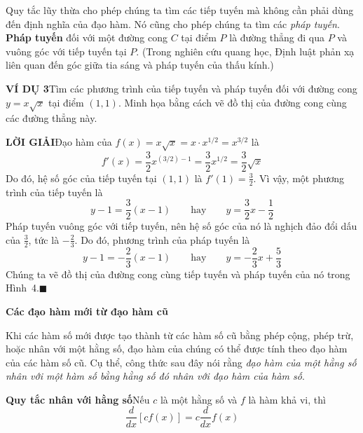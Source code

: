 \begin{minipage}[t]{0.70\textwidth}
    Quy tắc lũy thừa cho phép chúng ta tìm các tiếp tuyến mà không cần phải dùng đến định nghĩa của đạo hàm. Nó cũng cho phép chúng ta tìm các \textit{pháp tuyến}. \textbf{Pháp tuyến} đối với một đường cong $C$ tại điểm $P$ là đường thẳng đi qua $P$ và vuông góc với tiếp tuyến tại $P$. (Trong nghiên cứu quang học, Định luật phản xạ liên quan đến góc giữa tia sáng và pháp tuyến của thấu kính.)

    \vspace{0.4em}
    \noindent\textbf{\textsf{\color{stewartcyan}VÍ DỤ 3}}\hspace{0.8em}Tìm các phương trình của tiếp tuyến và pháp tuyến đối với đường cong $y = x\sqrt{x}$ tại điểm $(1, 1)$. Minh họa bằng cách vẽ đồ thị của đường cong cùng các đường thẳng này.

    \vspace{0.3em}
    \noindent\textbf{\textsf{\color{stewartcyan}LỜI GIẢI}}\hspace{0.8em}Đạo hàm của $f(x) = x\sqrt{x} = x \cdot x^{1/2} = x^{3/2}$ là
    \[
    f'(x) = \frac{3}{2}x^{(3/2)-1} = \frac{3}{2}x^{1/2} = \frac{3}{2}\sqrt{x}
    \]
    Do đó, hệ số góc của tiếp tuyến tại $(1, 1)$ là $f'(1) = \frac{3}{2}$. Vì vậy, một phương trình của tiếp tuyến là
    \[
    y - 1 = \frac{3}{2}(x - 1) \qquad \text{hay} \qquad y = \frac{3}{2}x - \frac{1}{2}
    \]
    Pháp tuyến vuông góc với tiếp tuyến, nên hệ số góc của nó là nghịch đảo đổi dấu của $\frac{3}{2}$, tức là $-\frac{2}{3}$. Do đó, phương trình của pháp tuyến là
    \[
    y - 1 = -\frac{2}{3}(x - 1) \qquad \text{hay} \qquad y = -\frac{2}{3}x + \frac{5}{3}
    \]
    Chúng ta vẽ đồ thị của đường cong cùng tiếp tuyến và pháp tuyến của nó trong Hình~4.\hfill{\color{stewartcyan}$\blacksquare$}

    \vspace{1.0em}
    \noindent{\color{stewartcyan}\rule{1.1ex}{1.1ex}}\hspace{0.5em}\textbf{\textsf{\large Các đạo hàm mới từ đạo hàm cũ}}

    \vspace{0.3em}
    Khi các hàm số mới được tạo thành từ các hàm số cũ bằng phép cộng, phép trừ, hoặc nhân với một hằng số, đạo hàm của chúng có thể được tính theo đạo hàm của các hàm số cũ. Cụ thể, công thức sau đây nói rằng \textit{đạo hàm của một hằng số nhân với một hàm số bằng hằng số đó nhân với đạo hàm của hàm số}.

    \vspace{0.5em}
    \begin{definitionbox}
        \noindent\textbf{\textsf{\color{stewartred}Quy tắc nhân với hằng số}}\hspace{0.8em}Nếu $c$ là một hằng số và $f$ là hàm khả vi, thì
        \[
        \frac{d}{dx} [c f(x)] = c \frac{d}{dx} f(x)
        \]
    \end{definitionbox}


\end{minipage}
